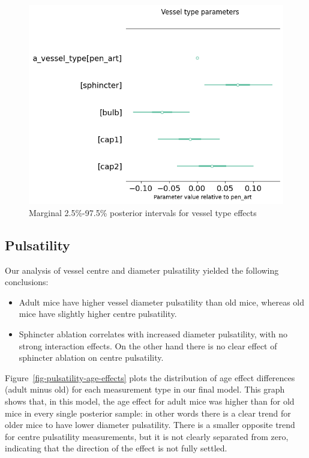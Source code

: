 \documentclass[
  letterpaper,
  DIV=11,
  numbers=noendperiod,
  oneside]{scrartcl}
\theoremstyle{plain}
\theoremstyle{remark}
\begin{document}
\begin{figure}

\begin{minipage}{\linewidth}

\includegraphics{../plots/whisker-vessel-type-effects.png}

\end{minipage}%

\caption{\label{fig-whisker-vessel-type-effects}Marginal 2.5\%-97.5\%
posterior intervals for vessel type effects}

\end{figure}%

\subsection{Pulsatility}\label{pulsatility}

Our analysis of vessel centre and diameter pulsatility yielded the
following conclusions:

\begin{itemize}
\item
  Adult mice have higher vessel diameter pulsatility than old mice,
  whereas old mice have slightly higher centre pulsatility.
\item
  Sphincter ablation correlates with increased diameter pulsatility,
  with no strong interaction effects. On the other hand there is no
  clear effect of sphincter ablation on centre pulsatility.
\end{itemize}

Figure~\ref{fig-pulsatility-age-effects} plots the distribution of age
effect differences (adult minus old) for each measurement type in our
final model. This graph shows that, in this model, the age effect for
adult mice was higher than for old mice in every single posterior
sample: in other words there is a clear trend for older mice to have
lower diameter pulsatility. There is a smaller opposite trend for centre
pulsatility measurements, but it is not clearly separated from zero,
indicating that the direction of the effect is not fully settled.
\end{document}
